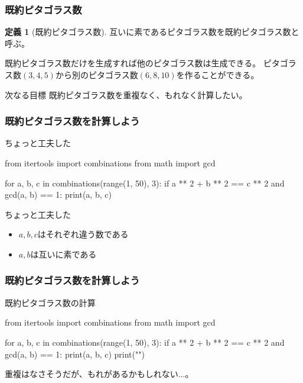 \documentclass[dvipdfmx,11pt,notheorems]{beamer}
\theoremstyle{definition}
\newtheorem{definition}{定義}
\begin{document}
\begin{frame}\frametitle{既約ピタゴラス数}

\begin{definition}[既約ピタゴラス数]
互いに素であるピタゴラス数を既約ピタゴラス数と呼ぶ。
\end{definition}

\begin{exampleblock}{既約ピタゴラス数だけを生成すれば他のピタゴラス数は生成できる。}
ピタゴラス数$(3, 4, 5)$から別のピタゴラス数$(6, 8, 10)$を作ることができる。
\end{exampleblock}

\begin{block}{次なる目標}
既約ピタゴラス数を重複なく、もれなく計算したい。
\end{block}

\end{frame}

\begin{frame}[fragile]\frametitle{既約ピタゴラス数を計算しよう}

\begin{block}{ちょっと工夫した}
\begin{pyverbatim}
from itertools import combinations
from math import gcd

for a, b, c in combinations(range(1, 50), 3):
    if a ** 2 + b ** 2 == c ** 2 and gcd(a, b) == 1:
        print(a, b, c)
\end{pyverbatim}
\end{block}

\begin{block}{ちょっと工夫した}
\begin{itemize}
\item $a,b,c$はそれぞれ違う数である
\item $a,b$は互いに素である
\end{itemize}
\end{block}

\end{frame}

\begin{frame}[fragile]\frametitle{既約ピタゴラス数を計算しよう}

\begin{block}{既約ピタゴラス数の計算}
\begin{pycode}
from itertools import combinations
from math import gcd

for a, b, c in combinations(range(1, 50), 3):
    if a ** 2 + b ** 2 == c ** 2 and gcd(a, b) == 1:
        print(a, b, c)
        print("\n")
\end{pycode}
\end{block}

重複はなさそうだが、もれがあるかもしれない...。

\end{frame}
\end{document}
